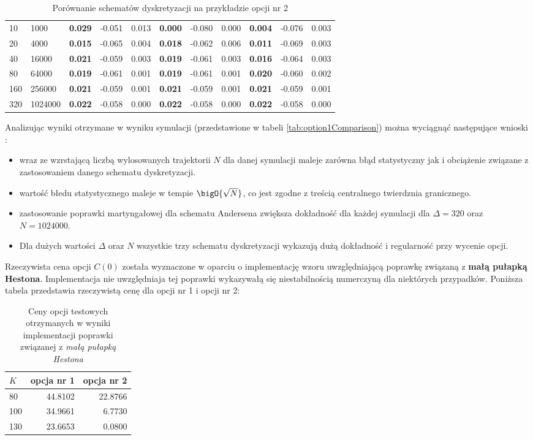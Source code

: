 \documentclass{pracamgr}
\begin{document}
\begin{table}[ht!]
{\begin{tabular}{l l| >{\bfseries}rrr @{\hskip 0.5in} >{\bfseries}rrr @{\hskip 0.5in} >{\bfseries}r r r}
\midrule
10 & 1000 & 0.029 & -0.051 & 0.013 & 0.000 & -0.080 & 0.000 & 0.004 & -0.076 & 0.003 \\
20 & 4000 & 0.015 & -0.065 & 0.004 & 0.018 & -0.062 & 0.006 & 0.011 & -0.069 & 0.003 \\
40 & 16000 & 0.021 & -0.059 & 0.003 & 0.019 & -0.061 & 0.003 & 0.016 & -0.064 & 0.003 \\
80 & 64000 & 0.019 & -0.061 & 0.001 & 0.019 & -0.061 & 0.001 & 0.020 & -0.060 & 0.002 \\
160 & 256000 & 0.021 & -0.059 & 0.001 & 0.021 & -0.059 & 0.001 & 0.021 & -0.059 & 0.001 \\
320 & 1024000 & 0.022 & -0.058 & 0.000 & 0.022 & -0.058 & 0.000 & 0.022 & -0.058 & 0.000 \\
\bottomrule
\end{tabular}
}
\caption{Porównanie schematów dyskretyzacji na przykładzie opcji nr 2}
\label{tab:option2Comparison}
\end{table}

Analizując wyniki otrzymane w wyniku symulacji (przedstawione w tabeli 
\ref{tab:option1Comparison}) można wyciągnąć następujące wnioski :
\begin{itemize}
  \item wraz ze wzrstającą liczbą wylosowanych trajektorii $N$ dla danej
  symulacji maleje zarówna błąd statystyczny jak i obciążenie związane z zastosowaniem 
  danego schematu dyskretyzacji. 
  \item wartość błedu statystycznego maleje w tempie $\bigO{\sqrt{N}}$, co jest
  zgodne z treścią centralnego twierdznia granicznego.
  \item zastosowanie poprawki martyngałowej dla schematu Andersena zwiększa
  dokładność dla każdej symulacji dla $\Delta = 320$ oraz $N = 1024000$.
  \item Dla dużych wartości $\Delta$ oraz $N$ wszystkie trzy schematu dyskretyzacji 
  wykazują dużą dokładność i regularność przy wycenie opcji.
\end{itemize}

Rzeczywista cena opcji $C(0)$ została wyznaczone w oparciu o implementację
wzoru uwzględniającą poprawkę związaną z \textbf{małą pułapką Hestona}.
Implementacja nie uwzględniaja tej poprawki wykazywałą się niestabilnością numerczyną 
dla niektórych przypadków. Poniższa tabela przedstawia rzeczywistą cenę dla
opcji nr 1 i opcji nr 2:
\begin{table}[htbp]
\centering 
\begin{tabular}{@{\hskip 0.5in}l |  @{\hskip 0.5in}r  @{\hskip 0.5in}r  }
\toprule
$K$ & opcja nr 1 & opcja nr 2\\
\midrule
80 & 44.8102 & 22.8766 \\
100 & 34.9661 & 6.7730 \\
130 & 23.6653 & 0.0800 \\
\bottomrule
\end{tabular}
\caption{Ceny opcji testowych otrzymanych w wyniki implementacji 
         poprawki związanej z \textit{małą pułapką Hestona}}
\label{tab:littleTrapOption1}
\end{table}
\end{document}

